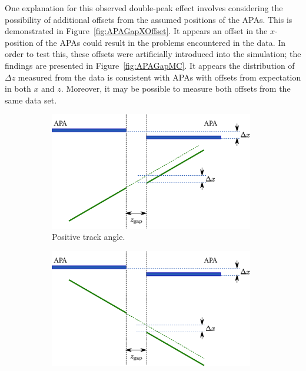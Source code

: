 One explanation for this observed double-peak effect involves considering the possibility of additional offsets from the assumed positions of the APAs.  This is demonstrated in Figure~\ref{fig:APAGapXOffset}.  It appears an offset in the $x$-position of the APAs could result in the problems encountered in the data.  In order to test this, these offsets were artificially introduced into the simulation; the findings are presented in Figure~\ref{fig:APAGapMC}.  It appears the distribution of $\Delta z$ measured from the data is consistent with APAs with offsets from expectation in both $x$ and $z$.  Moreover, it may be possible to measure both offsets from the same data set.

\begin{figure}
  \centering
  \begin{subfigure}[t]{0.48\linewidth}
    \centering
    \includegraphics[width=0.98\textwidth]{apa_gap_xoffset_pos.eps}
    \caption{Positive track angle.}
    \label{fig:APAGapXOffsetPos}
  \end{subfigure}
  \hfill
  \begin{subfigure}[t]{0.48\linewidth}
    \centering
    \includegraphics[width=0.98\textwidth]{apa_gap_xoffset_neg.eps}

\end{subfigure}
\end{figure}
